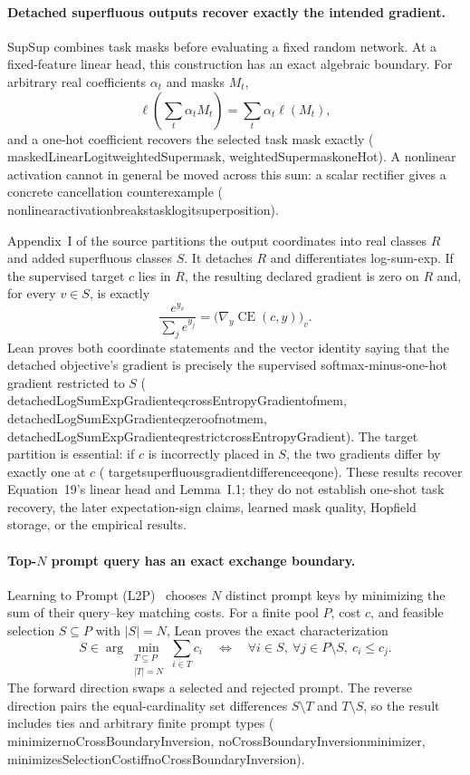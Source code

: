 \documentclass[11pt]{article}
\newcommand{\leanname}[1]{{\scriptsize\ttfamily
  \def\_{\textunderscore\allowbreak}#1}}
\begin{document}
\paragraph{Detached superfluous outputs recover exactly the intended gradient.}
SupSup \cite{wortsman2020supermasks} combines task masks before evaluating a
fixed random network. At a fixed-feature linear head, this construction has
an exact algebraic boundary. For arbitrary real coefficients $\alpha_t$ and
masks $M_t$,
\[
 \ell\!\left(\sum_t\alpha_t M_t\right)
   =\sum_t\alpha_t\ell(M_t),
\]
and a one-hot coefficient recovers the selected task mask exactly
(\leanname{maskedLinearLogit\_weightedSupermask},
\leanname{weightedSupermask\_oneHot}). A nonlinear activation cannot in
general be moved across this sum: a scalar rectifier gives a concrete
cancellation counterexample
(\leanname{nonlinear\_activation\_breaks\_task\_logit\_superposition}).

Appendix~I of the source partitions the output coordinates into real classes
$R$ and added superfluous classes $S$. It detaches $R$ and differentiates
log-sum-exp. If the supervised target $c$ lies in $R$, the resulting declared
gradient is zero on $R$ and, for every $v\in S$, is exactly
\[
 \frac{e^{y_v}}{\sum_j e^{y_j}}
 =\bigl(\nabla_y\operatorname{CE}(c,y)\bigr)_v .
\]
Lean proves both coordinate statements and the vector identity saying that
the detached objective's gradient is precisely the supervised
softmax-minus-one-hot gradient restricted to $S$
(\leanname{detachedLogSumExpGradient\_eq\_crossEntropyGradient\_of\_mem},
\leanname{detachedLogSumExpGradient\_eq\_zero\_of\_not\_mem},
\leanname{detachedLogSumExpGradient\_eq\_restrict\_crossEntropyGradient}).
The target partition is essential: if $c$ is incorrectly placed in $S$, the
two gradients differ by exactly one at $c$
(\leanname{target\_superfluous\_gradient\_difference\_eq\_one}).
These results recover Equation~19's linear head and Lemma~I.1; they do not
establish one-shot task recovery, the later expectation-sign claims, learned
mask quality, Hopfield storage, or the empirical results.

\paragraph{Top-\texorpdfstring{$N$}{N} prompt query has an exact exchange boundary.}
Learning to Prompt (L2P)~\cite{wang2022l2p} chooses $N$ distinct prompt keys
by minimizing the sum of their query--key matching costs.  For a finite pool
$P$, cost $c$, and feasible selection $S\subseteq P$ with $|S|=N$, Lean proves
the exact characterization
\[
 S\in\arg\min_{\substack{T\subseteq P\\|T|=N}}\sum_{i\in T}c_i
 \quad\Longleftrightarrow\quad
 \forall i\in S,\ \forall j\in P\setminus S,\ c_i\leq c_j .
\]
The forward direction swaps a selected and rejected prompt.  The reverse
direction pairs the equal-cardinality set differences $S\setminus T$ and
$T\setminus S$, so the result includes ties and arbitrary finite prompt
types
(\leanname{minimizer\_noCrossBoundaryInversion},
\leanname{noCrossBoundaryInversion\_minimizer},
\leanname{minimizesSelectionCost\_iff\_noCrossBoundaryInversion}).
\end{document}
